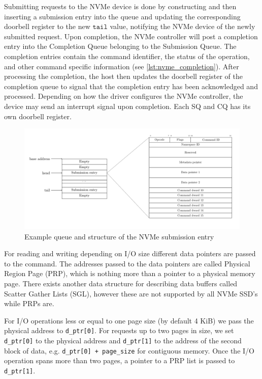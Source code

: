 Submitting requests to the NVMe device is done by constructing and then inserting a submission entry into the queue and updating the corresponding doorbell register to the new $\texttt{tail}$ value, notifying the NVMe device of the newly submitted request. Upon completion, the NVMe controller will post a completion entry into the Completion Queue belonging to the Submission Queue. The completion entries contain the command identifier, the status of the operation, and other command specific information (see \ref{lst:nvme_completion}). After processing the completion, the host then updates the doorbell register of the completion queue to signal that the completion entry has been acknowledged and processed. Depending on how the driver configures the NVMe controller, the device may send an interrupt signal upon completion. Each SQ and CQ has its own doorbell register.

\begin{figure}
  \centering
    \includegraphics[width=\textwidth]{figures/nvme-queue}
    \caption{Example queue and structure of the NVMe submission entry}
    \label{fig:nvme-queue}
\end{figure}


For reading and writing depending on I/O size different data pointers are passed to the command. The addresses passed to the data pointers are called Physical Region Page (PRP), which is nothing more than a pointer to a physical memory page. There exists another data structure for describing data buffers called Scatter Gather Lists (SGL), however these are not supported by all NVMe SSD's while PRPs are.

For I/O operations less or equal to one page size (by default 4 KiB) we pass the physical address to \texttt{d\_ptr[0]}. For requests up to two pages in size, we set \texttt{d\_ptr[0]} to the physical address and \texttt{d\_ptr[1]} to the address of the second block of data, e.g. \texttt{d\_ptr[0] + page\_size} for contiguous memory. Once the I/O operation spans more than two pages, a pointer to a PRP list is passed to \texttt{d\_ptr[1]}.

